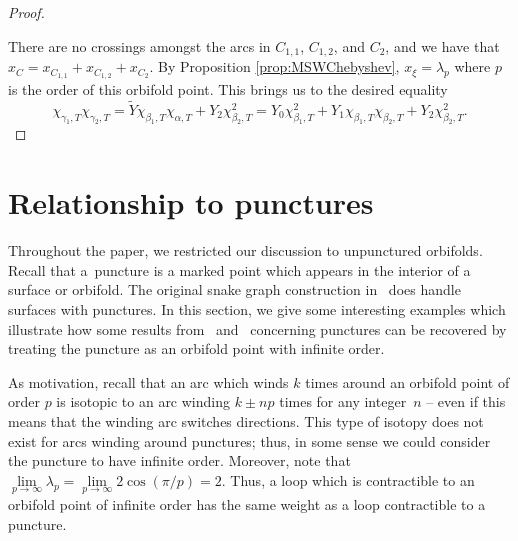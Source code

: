 \documentclass[pdftex]{sigma}%
\numberwithin{equation}{section}
\begin{document}
\begin{proof}
\begin{center}
\end{center}

There are no crossings amongst the arcs in $C_{1,1}$, $C_{1,2}$, and $C_2$, and we have that $x_C = x_{C_{1,1}} + x_{C_{1,2}} + x_{C_2}$. By Proposition \ref{prop:MSWChebyshev}, $x_\xi = \lambda_p$ where $p$ is the order of this orbifold point. This brings us to the desired equality \[
\chi_{\gamma_1,T} \chi_{\gamma_2,T} = \widetilde{Y} \chi_{\beta_1,T} \chi_{\alpha,T} + Y_2 \chi_{\beta_2,T}^2 = Y_0 \chi_{\beta_1,T}^2 + Y_1 \chi_{\beta_1,T} \chi_{\beta_2,T} + Y_2 \chi_{\beta_2,T}^2.\tag*{\qed}
\]\renewcommand{\qed}{}
\end{proof}

\section{Relationship to punctures}\label{sec:RelateToPuncture}

Throughout the paper, we restricted our discussion to unpunctured orbifolds. Recall that a~puncture is a marked point which appears in the interior of a surface or orbifold. The original snake graph construction in~\cite{MSW} does handle surfaces with punctures. In this section, we give some interesting examples which illustrate how some results from~\cite{MSW} and~\cite{MW} concerning punctures can be recovered by treating the puncture as an orbifold point with infinite order.

As motivation, recall that an arc which winds $k$ times around an orbifold point of order $p$ is isotopic to an arc winding $k \pm np$ times for any integer~$n$ -- even if this means that the winding arc switches directions. This type of isotopy does not exist for arcs winding around punctures; thus, in some sense we could consider the puncture to have infinite order. Moreover, note that $\lim\limits_{p \to \infty} \lambda_p = \lim\limits_{p \to \infty} 2 \cos(\pi/p) = 2$. Thus, a loop which is contractible to an orbifold point of infinite order has the same weight as a loop contractible to a puncture.
\end{document}
